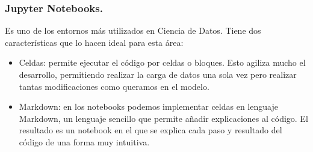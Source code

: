 \documentclass[a4paper,10pt]{article}
\begin{document}
\subsubsection{Jupyter Notebooks.}
Es uno de los entornos más utilizados en Ciencia de Datos. Tiene dos características que lo hacen ideal para esta área:
\begin{itemize}
\item  Celdas: permite ejecutar el código por celdas o bloques. Esto agiliza mucho el desarrollo, permitiendo realizar la carga de datos una sola vez pero realizar tantas modificaciones como queramos en el modelo.
\item Markdown: en los notebooks podemos implementar celdas en lenguaje Markdown, un lenguaje sencillo que permite añadir explicaciones al código. El resultado es un notebook en el que se explica cada paso y resultado del código de una forma muy intuitiva.
\end{itemize}
\end{document}
